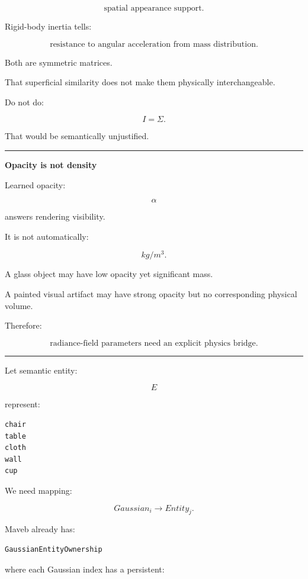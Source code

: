 \[
\boxed{
\text{spatial appearance support}.
}
\]

Rigid-body inertia tells:

\[
\boxed{
\text{resistance to angular acceleration from mass distribution}.
}
\]

Both are symmetric matrices.

That superficial similarity does not make them physically interchangeable.

Do not do:

\[
I=\Sigma.
\]

That would be semantically unjustified.

\begin{center}\rule{0.5\linewidth}{0.5pt}\end{center}

\textbf{Opacity is not density}

Learned opacity:

\[
\alpha
\]

answers rendering visibility.

It is not automatically:

\[
kg/m^3.
\]

A glass object may have low opacity yet significant mass.

A painted visual artifact may have strong opacity but no corresponding physical volume.

Therefore:

\[
\boxed{
\text{radiance-field parameters need an explicit physics bridge}.
}
\]

\begin{center}\rule{0.5\linewidth}{0.5pt}\end{center}

Let semantic entity:

\[
E
\]

represent:

\protect{}\label{f0n5qg}%
\begin{verbatim}
chair
table
cloth
wall
cup
\end{verbatim}

We need mapping:

\[
\boxed{
Gaussian_i
\rightarrow
Entity_j.
}
\]

Maveb already has:

\begin{verbatim}
GaussianEntityOwnership
\end{verbatim}

where each Gaussian index has a persistent:

